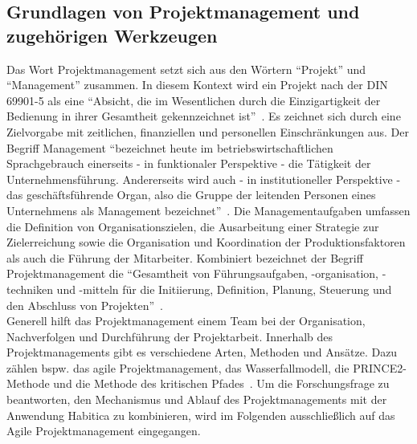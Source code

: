 \documentclass[sigconf, nonacm]{acmart}
\begin{document}
\subsection{Grundlagen von Projektmanagement und zugehörigen Werkzeugen}\label{sec:pmtia}
Das Wort Projektmanagement setzt sich aus den Wörtern \enquote{Projekt} und \enquote{Management} zusammen. 
In diesem Kontext wird ein Projekt nach der DIN 69901-5 als eine \enquote{Absicht, die im Wesentlichen durch die Einzigartigkeit der Bedienung in ihrer Gesamtheit gekennzeichnet ist}~\cite{DIN69901-5}. Es zeichnet sich durch eine Zielvorgabe mit zeitlichen, finanziellen und personellen Einschränkungen aus.
Der Begriff Management \enquote{bezeichnet heute im betriebswirtschaftlichen Sprachgebrauch einerseits - in funktionaler Perspektive - die Tätigkeit der Unternehmensführung. Andererseits wird auch - in institutioneller Perspektive - das geschäftsführende Organ, also die Gruppe der leitenden Personen eines Unternehmens als Management bezeichnet}~\cite{haric_definition_nodate}.
Die Managementaufgaben umfassen die Definition von Organisationszielen, die Ausarbeitung einer Strategie zur Zielerreichung sowie die Organisation und Koordination der Produktionsfaktoren als auch die Führung der Mitarbeiter.
Kombiniert bezeichnet der Begriff Projektmanagement die \enquote{Gesamtheit von Führungsaufgaben, -organisation, -techniken und -mitteln für die Initiierung, Definition, Planung, Steuerung und den Abschluss von Projekten}~\cite{DIN69901-5}.
\\
Generell hilft das Projektmanagement einem Team bei der Organisation, Nachverfolgen und Durchführung der Projektarbeit. Innerhalb des Projektmanagements gibt es verschiedene Arten, Methoden und Ansätze. Dazu zählen bspw. das agile Projektmanagement, das Wasserfallmodell, die PRINCE2-Methode und die Methode des kritischen Pfades~\cite{asana_projektmanagement_nodate}. Um die Forschungsfrage zu beantworten, den Mechanismus und Ablauf des Projektmanagements mit der Anwendung Habitica zu kombinieren, wird im Folgenden ausschließlich auf das Agile Projektmanagement eingegangen.
\end{document}
